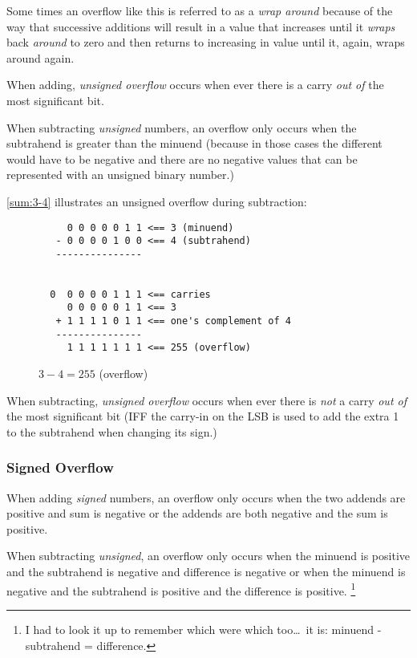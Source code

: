 Some times an overflow like this is referred to as a {\em wrap around}
because of the way that successive additions will result in a value that
increases until it {\em wraps} back {\em around} to zero and then 
returns to increasing in value until it, again, wraps around again.

\begin{tcolorbox}
When adding, {\em unsigned overflow} occurs when ever there is a carry
{\em out of} the most significant bit.
\end{tcolorbox}



When subtracting {\em unsigned} numbers, an overflow only occurs when the
subtrahend is greater than the minuend (because in those cases the 
different would have to be negative and there are no negative values 
that can be represented with an unsigned binary number.)

\autoref{sum:3-4} illustrates an unsigned overflow during subtraction:

\begin{figure}[H]
\centering
\begin{BVerbatim}
     0 0 0 0 0 1 1 <== 3 (minuend)
   - 0 0 0 0 1 0 0 <== 4 (subtrahend)
   ---------------


  0  0 0 0 0 1 1 1 <== carries
     0 0 0 0 0 1 1 <== 3
   + 1 1 1 1 0 1 1 <== one's complement of 4
   ---------------
     1 1 1 1 1 1 1 <== 255 (overflow)
\end{BVerbatim}
\caption{$3-4=255$ (overflow)}
\label{sum:3-4}
\end{figure}

\begin{tcolorbox}
When subtracting, {\em unsigned overflow} occurs when ever there is {\em not} a carry
{\em out of} the most significant bit (IFF the carry-in on the LSB is used to add the
extra 1 to the subtrahend when changing its sign.)
\end{tcolorbox}


\subsubsection{Signed Overflow}

When adding {\em signed} numbers, an overflow only occurs when the two 
addends are positive and sum is negative or the addends are both negative 
and the sum is positive.  

When subtracting {\em unsigned}, an overflow only occurs when the
minuend is positive and the subtrahend is negative and difference is negative
or when the minuend is negative and the subtrahend is positive and the 
difference is positive.%
\footnote{I had to look it up to remember which were which 
too\ldots\ it is: minuend - subtrahend = difference.\cite{subtrahend}}

